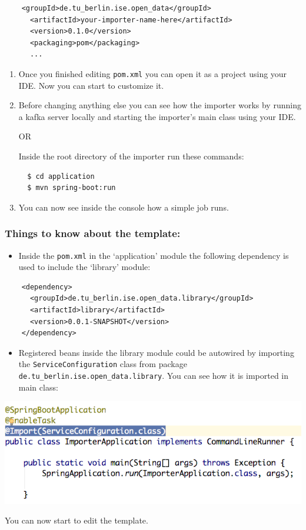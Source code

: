 \begin{verbatim}
    <groupId>de.tu_berlin.ise.open_data</groupId>
      <artifactId>your-importer-name-here</artifactId>
      <version>0.1.0</version>
      <packaging>pom</packaging>
      ...
\end{verbatim}

\begin{enumerate}
\def\labelenumi{\arabic{enumi}.}
\setcounter{enumi}{2}
\item
  Once you finished editing \texttt{pom.xml} you can open it as a
  project using your IDE. Now you can start to customize it.
\item
  Before changing anything else you can see how the importer works by
  running a kafka server locally and starting the importer's main class
  using your IDE.

  OR

  Inside the root directory of the importer run these commands:

\begin{verbatim}
  $ cd application
  $ mvn spring-boot:run
\end{verbatim}
\item
  You can now see inside the console how a simple job runs.
\end{enumerate}

\subsubsection{Things to know about the
template:}\label{things-to-know-about-the-template}

\begin{itemize}
\tightlist
\item
  Inside the \texttt{pom.xml} in the `application' module the following
  dependency is used to include the `library' module:
\end{itemize}

\begin{verbatim}
    <dependency>
      <groupId>de.tu_berlin.ise.open_data.library</groupId>
      <artifactId>library</artifactId>
      <version>0.0.1-SNAPSHOT</version>
    </dependency>
\end{verbatim}

\begin{itemize}
\tightlist
\item
  Registered beans inside the library module could be autowired by
  importing the \texttt{ServiceConfiguration} class from package
  \texttt{de.tu\_berlin.ise.open\_data.library}. You can see how it is imported
  in main class:
\end{itemize}

\includegraphics[width=1.00\textwidth]{images/template.png}

You can now start to edit the template.
